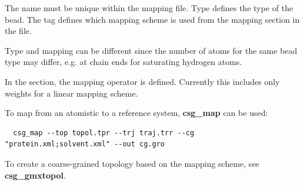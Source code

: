 The name must be unique within the mapping file. Type defines the type of the bead. The  tag defines which mapping scheme is used from the mapping section in the file.

Type and mapping can be different since the number of atoms for the same bead type may differ, e.g. at chain ends for saturating hydrogen atoms.

In the  section, the mapping operator is defined. Currently this includes only weights for a linear mapping scheme.

To map from an atomistic to a reference system, \textbf{csg\_map} can be used:
\begin{verbatim}
  csg_map --top topol.tpr --trj traj.trr --cg "protein.xml;solvent.xml" --out cg.gro
\end{verbatim}

To create a coarse-grained topology based on the mapping scheme, see \textbf{csg\_gmxtopol}.
